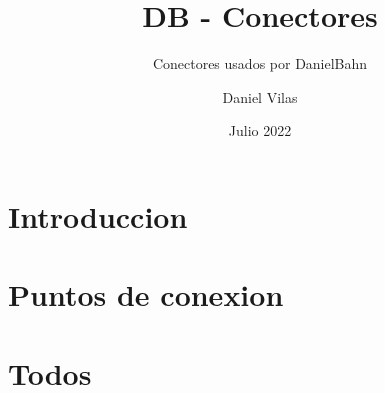 \documentclass[spanish]{DccDiyTools/DccDiyTools}
\title{DB - Conectores}
\subtitle{Conectores usados por DanielBahn}
\author{Daniel Vilas}
\date{Julio 2022}
\begin{document}
\maketitle
\section{Introduccion}

\newpage
\section{Puntos de conexion}



\newpage
\section{Todos}

\end{document}
